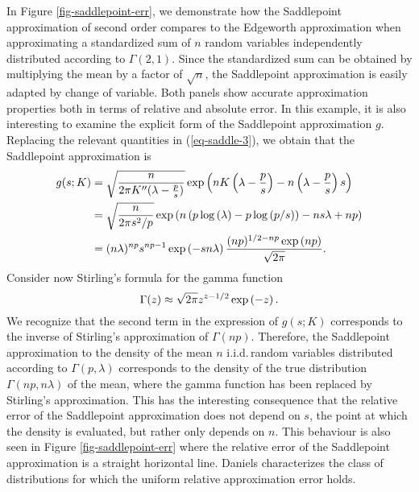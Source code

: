 \begin{example}
    In Figure \ref{fig-saddlepoint-err}, we demonstrate how the Saddlepoint approximation of second order compares to the Edgeworth approximation when approximating a standardized sum of $n$ random variables independently distributed according to $\Gamma(2, 1)$. Since the standardized sum can be obtained by multiplying the mean by a factor of $\sqrt{n}$, the Saddlepoint approximation is easily adapted by change of variable. Both panels show accurate approximation properties both in terms of relative and absolute error.
    \newline
    In this example, it is also interesting to examine the explicit form of the Saddlepoint approximation $g$. Replacing the relevant quantities in (\ref{eq-saddle-3}), we obtain that the Saddlepoint approximation is
    \begin{align*}
        g(s; K) &= \sqrt{\frac{n}{2\pi K''(\lambda - \frac{p}{s})}} \exp\left(nK\left(\lambda - \frac{p}{s}\right) - n\left(\lambda - \frac{p}{s}\right)s\right)\\
        &= \sqrt{\frac{n}{2\pi s^2/p}} \exp\left(n\left(p\log\left(\lambda\right) - p\log\left(p/s\right)\right) - ns\lambda + np\right)\\
        &= (n\lambda)^{np}s^{np-1}\exp\left(-sn\lambda\right)  \frac{(np)^{1/2-np}\exp\left(np\right)}{\sqrt{2\pi}}.
    \end{align*}
    Consider now Stirling's formula for the gamma function
    \begin{equation*}
        \Gamma(z) \approx \sqrt{2\pi}z^{z-1/2}\exp\left(-z\right).
    \end{equation*}
    We recognize that the second term in the expression of $g(s; K)$ corresponds to the inverse of Stirling's approximation of $\Gamma(np)$. Therefore, the Saddlepoint approximation to the density of the mean $n$ i.i.d.\,random variables distributed according to $\Gamma(p, \lambda)$ corresponds to the density of the true distribution $\Gamma(np, n\lambda)$ of the mean, where the gamma function has been replaced by Stirling's approximation. This has the interesting consequence that the relative error of the Saddlepoint approximation does not depend on $s$, the point at which the density is evaluated, but rather only depends on $n$. This behaviour is also seen in Figure \ref{fig-saddlepoint-err} where the relative error of the Saddlepoint approximation is a straight horizontal line. Daniels \cite{daniels1954saddlepoint} characterizes the class of distributions for which the uniform relative approximation error holds.

  
    
\end{example}